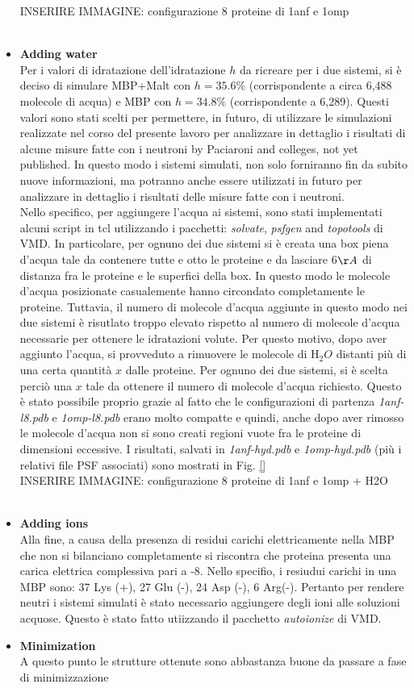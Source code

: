 \begin{itemize}
INSERIRE IMMAGINE: configurazione 8 proteine di 1anf e 1omp\\
\\
\item \textbf{Adding water}\\
Per i valori di idratazione dell'idratazione $h$ da ricreare per i due sistemi, si è deciso di simulare MBP+Malt con $h = 35.6\%$ (corrispondente a circa 6,488 molecole di acqua) e MBP con $h = 34.8\%$ (corrispondente a  6,289). Questi valori sono stati scelti per permettere, in futuro, di utilizzare le simulazioni realizzate nel corso del presente lavoro per analizzare in dettaglio i risultati di alcune misure fatte con i neutroni by Paciaroni and colleges, not yet published. In questo modo i sistemi simulati, non solo forniranno fin da subito nuove informazioni, ma potranno anche essere utilizzati in futuro per analizzare in dettaglio i risultati delle misure fatte con i neutroni.\\
Nello specifico, per aggiungere l'acqua ai sistemi, sono stati implementati alcuni script in tcl utilizzando i pacchetti: \textit{solvate}, \textit{psfgen} and \textit{topotools} di VMD. In particolare, per ognuno dei due sistemi si è creata una box piena d'acqua tale da contenere tutte e otto le proteine e da lasciare 6$\AA$ di distanza fra le proteine e le superfici della box. In questo modo le molecole d'acqua posizionate casualemente hanno circondato completamente le proteine. Tuttavia, il numero di molecole d'acqua aggiunte in questo modo nei due sistemi è risutlato troppo elevato rispetto al numero di molecole d'acqua necessarie per ottenere le idratazioni volute. Per questo motivo, dopo aver aggiunto l'acqua, si provveduto a rimuovere le molecole di H$_2O$ distanti più di una certa quantità $x$ dalle proteine. Per ognuno dei due sistemi, si è scelta perciò una $x$ tale da ottenere il numero di molecole d'acqua richiesto. Questo è stato possibile proprio grazie al fatto che le configurazioni di partenza \textit{1anf-l8.pdb} e \textit{1omp-l8.pdb} erano molto compatte e quindi, anche dopo aver rimosso le molecole d'acqua non si sono creati regioni vuote fra le proteine di dimensioni eccessive. I risultati, salvati in \textit{1anf-hyd.pdb} e \textit{1omp-hyd.pdb} (più i relativi file PSF associati) sono mostrati in Fig. \ref{}
\\
INSERIRE IMMAGINE: configurazione 8 proteine di 1anf e 1omp + H2O\\
\\
\item \textbf{Adding ions}\\
Alla fine, a causa della presenza di residui carichi elettricamente nella MBP che non si bilanciano completamente si riscontra che proteina presenta una carica elettrica complessiva pari a -8. Nello specifio, i resiudui carichi in una MBP sono: 37 Lys (+), 27 Glu (-), 24 Asp (-), 6 Arg(-). Pertanto per rendere neutri i sistemi simulati è stato necessario aggiungere degli ioni alle soluzioni acquose. Questo è stato fatto utiizzando il pacchetto \textit{autoionize} di VMD.

\item \textbf{Minimization}\\
A questo punto le strutture ottenute sono abbastanza buone da passare a fase di minimizzazione
\end{itemize} 


